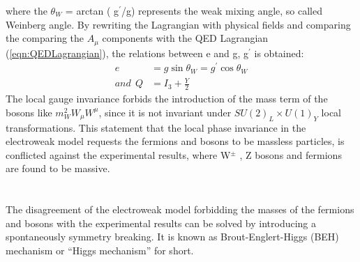 where the $\theta_{W}$ = arctan ( g$^{\prime}$/g) represents the weak mixing angle, so called Weinberg angle. By rewriting the Lagrangian with physical fields and comparing the comparing the $A_{\mu}$ components with the QED Lagrangian (\ref{eqn:QEDLagrangian}), the relations between e and g, g$^{\prime}$ is obtained:
\begin{equation}
\begin{aligned}
e&=g \sin \theta_{W}=g^{\prime} \cos \theta_{W} \\
and \ \ Q&=I_{3}+\frac{Y}{2}
\end{aligned}
\end{equation}
The local gauge invariance forbids the introduction of the mass term of the bosons like $m^2_W W_\mu W^\mu$, since it is not invariant under $SU(2)_L \times U(1)_Y$ local transformations.
This statement that the local phase invariance in the electroweak model requests the fermions and bosons to be massless particles, is conflicted against the experimental results, where W$^{\pm}$ , Z bosons and fermions are found to be massive.
\\ \\
\noindent\textbf{} \\ 
The disagreement of the electroweak model forbidding the masses of the fermions and bosons with the experimental results can be solved by introducing a spontaneously symmetry breaking.
It is known as Brout-Englert-Higgs (BEH) mechanism or “Higgs mechanism” for short.

